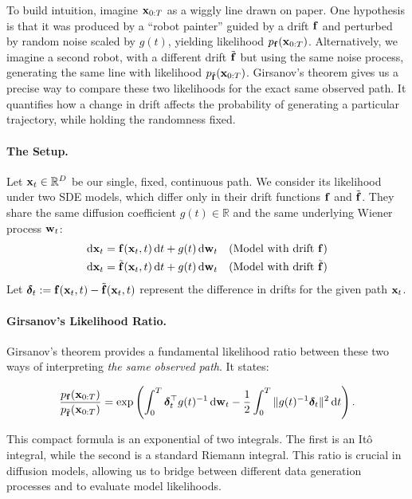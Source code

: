 To build intuition, imagine ${\mathbf{x}}_{0:T}$ as a wiggly line drawn on paper. One hypothesis is that it was produced by a ``robot painter'' guided by a drift ${\mathbf{f}}$ and perturbed by random noise scaled by $g(t)$, yielding likelihood $p_{{\mathbf{f}}}({\mathbf{x}}_{0:T})$. Alternatively, we imagine a second robot, with a different drift $\tilde{{\mathbf{f}}}$ but using the same noise process, generating the same line with likelihood $p_{\tilde{{\mathbf{f}}}}({\mathbf{x}}_{0:T})$. Girsanov’s theorem gives us a precise way to compare these two likelihoods for the exact same observed path. It quantifies how a change in drift affects the probability of generating a particular trajectory, while holding the randomness fixed.

\paragraph{The Setup.}
Let ${\mathbf{x}}_t \in \mathbb{R}^D$ be our single, fixed, continuous path. We consider its likelihood under two SDE models, which differ only in their drift functions ${\mathbf{f}}$ and $\tilde{{\mathbf{f}}}$. They share the same diffusion coefficient $g(t) \in \mathbb{R}$ and the same underlying Wiener process ${\mathbf{w}}_t$:
\begin{align*}
    \mathop{}\!\mathrm{d}{\mathbf{x}}_t &= {\mathbf{f}}({\mathbf{x}}_t, t)\mathop{}\!\mathrm{d} t + g(t)\mathop{}\!\mathrm{d}{\mathbf{w}}_t \quad (\text{Model with drift } {\mathbf{f}}) \\
    \mathop{}\!\mathrm{d}{\mathbf{x}}_t &= \tilde{{\mathbf{f}}}({\mathbf{x}}_t, t)\mathop{}\!\mathrm{d} t + g(t)\mathop{}\!\mathrm{d}{\mathbf{w}}_t \quad (\text{Model with drift } \tilde{{\mathbf{f}}})
\end{align*}
Let $\bm{\delta}_t := {\mathbf{f}}({\mathbf{x}}_t, t) - \tilde{{\mathbf{f}}}({\mathbf{x}}_t, t)$ represent the difference in drifts for the given path ${\mathbf{x}}_t$.

\paragraph{Girsanov's Likelihood Ratio.}
Girsanov's theorem provides a fundamental likelihood ratio between these two ways of interpreting \emph{the same observed path}. It states:
\begin{mdframed}
\[
\frac{p_{{\mathbf{f}}}({\mathbf{x}}_{0:T})}{p_{\tilde{{\mathbf{f}}}}({\mathbf{x}}_{0:T})} = \exp\left( \int_0^T \bm{\delta}_t^\top g(t)^{-1} \mathop{}\!\mathrm{d}{\mathbf{w}}_t - \frac{1}{2} \int_0^T \| g(t)^{-1} \bm{\delta}_t \|^2 \mathop{}\!\mathrm{d} t \right).
\]
\end{mdframed}
This compact formula is an exponential of two integrals. The first is an It\^o integral, while the second is a standard Riemann integral. This ratio is crucial in diffusion models, allowing us to bridge between different data generation processes and to evaluate model likelihoods.

